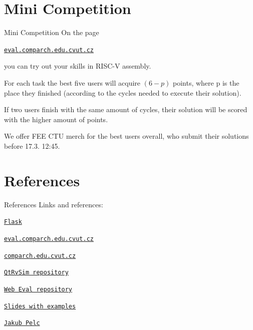 \documentclass{beamer}
\begin{document}
	\section{Mini Competition}

	\begin{frame}{Mini Competition}
		On the page \par
		{\centering \texttt{\href{http://eval.comparch.edu.cvut.cz}{eval.comparch.edu.cvut.cz}} \par}
		you can try out your skills in RISC-V assembly. \par

		For each task the best five users will acquire $(6 - p)$ points, where p is the place they finished (according to the cycles needed to execute their solution).\par
		
		If two users finish with the same amount of cycles, their solution will be scored with the higher amount of points. \par

		We offer FEE CTU merch for the best users overall, who submit their solutions before 17.3. 12:45. \par
	\end{frame}

	\section{References}

	\begin{frame}{References}
		Links and references: \par
		{\centering \texttt{\href{https://flask.palletsprojects.com/en/3.0.x/}{Flask}} \par}
		{\centering \texttt{\href{http://eval.comparch.edu.cvut.cz}{eval.comparch.edu.cvut.cz}} \par}
		{\centering \texttt{\href{http://comparch.edu.cvut.cz}{comparch.edu.cvut.cz}} \par}
		{\centering \texttt{\href{https://github.com/cvut/qtrvsim}{QtRvSim repository}} \par}
		{\centering \texttt{\href{https://gitlab.fel.cvut.cz/b35apo/qtrvsim-eval-web}{Web Eval repository}} \par}
		{\centering \texttt{\href{https://github.com/kubakubakuba/if24-flask-web-eval}{Slides with examples}} \par}
		{\centering \texttt{\href{https://swpelc.eu}{Jakub Pelc}} \par}
	\end{frame}
\end{document}
